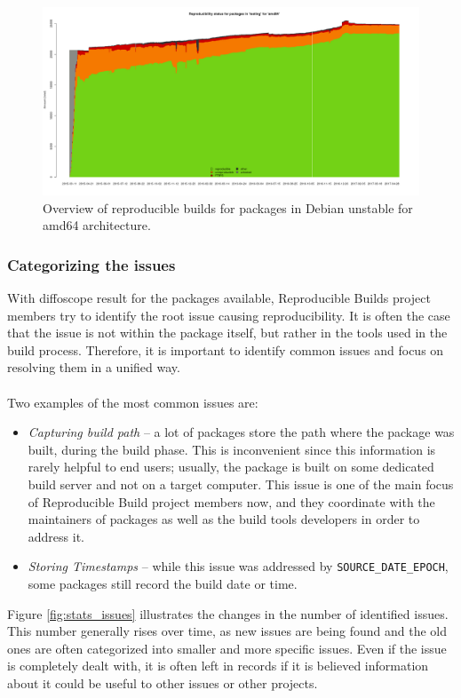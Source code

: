 {\begin{figure}
\centering
\includegraphics[width=1.0\textwidth]{fig/stats_pkg_state.png}
\caption{\label{fig:stats_sid}Overview of reproducible builds for packages in Debian unstable for amd64 architecture.}
\end{figure}

\subsubsection[Categorizing the issues]{Categorizing the issues} 
With diffoscope result for the packages available, Reproducible Builds project members try to identify the root issue causing reproducibility. It is often the case that the issue is not within the package itself, but rather in the tools used in the build process. Therefore, it is important to identify common issues and focus on resolving them in a unified way.\\\\
Two examples of the most common issues are:
\begin{itemize}[noitemsep]
\item \textit{Capturing build path} -- a lot of packages store the path where the package was built, during the build phase. This is inconvenient since this information is rarely helpful to end users; usually, the package is built on some dedicated build server and not on a target computer. This issue is one of the main focus of Reproducible Build project members now, and they coordinate with the maintainers of packages as well as the build tools developers in order to address it.
\item \textit{Storing Timestamps} -- while this issue was addressed by \texttt{SOURCE\_DATE\_EPOCH}, some packages still record the build date or time.
\end{itemize}
Figure \ref{fig:stats_issues} illustrates the changes in the number of identified issues. This number generally rises over time, as new issues are being found and the old ones are often categorized into smaller and more specific issues. Even if the issue is completely dealt with, it is often left in records if it is believed information about it could be useful to other issues or other projects.\\\\

}
